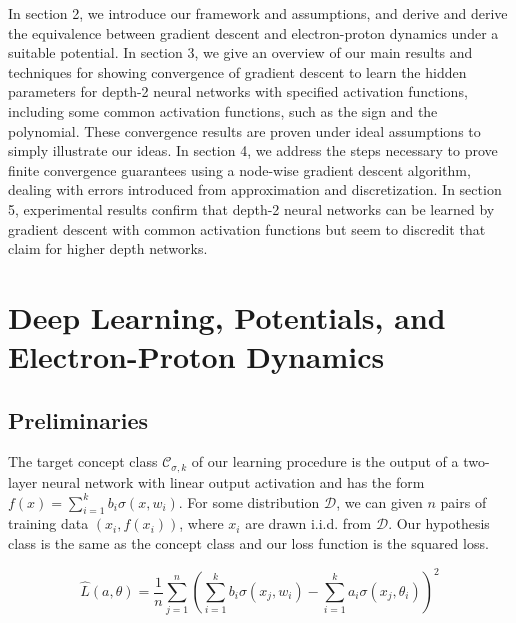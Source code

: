 \documentclass{article}
\begin{document}
In section 2, we introduce our framework and assumptions, and derive and derive the equivalence between gradient descent and electron-proton dynamics under a suitable potential. In section 3, we give an overview of our main results and techniques for showing convergence of gradient descent to learn the hidden parameters for depth-2 neural networks with specified activation functions, including some common activation functions, such as the sign and the polynomial. These convergence results are proven under ideal assumptions to simply illustrate our ideas. In section 4, we address the steps necessary to prove finite convergence guarantees using a node-wise gradient descent algorithm, dealing with errors introduced from approximation and discretization. In section 5, experimental results confirm that depth-2 neural networks can be learned by gradient descent with common activation functions but seem to discredit that claim for higher depth networks.  


\section{Deep Learning, Potentials, and Electron-Proton Dynamics}

\subsection{Preliminaries}

The target concept class $\mathcal{C}_{\sigma,k}$ of our learning procedure is the output of a two-layer neural network with linear output activation and has the form $f(x) = \sum_{i=1}^k b_i\sigma(x,w_i)$. For some distribution $\mathcal{D}$, we can given $n$ pairs of training data $(x_i, f(x_i))$, where $x_i$ are drawn i.i.d. from $\mathcal{D}$. Our hypothesis class is the same as the concept class and our loss function is the squared loss. 

\begin{equation}\label{errEmp}
\widehat{L}(a,\theta)  = \frac{1}{n}\sum_{j=1}^n \left(\sum_{i=1}^k b_i\sigma(x_j,w_i) - \sum_{i=1}^k a_i \sigma(x_j,\theta_i)\right)^2
\end{equation}
\end{document}
